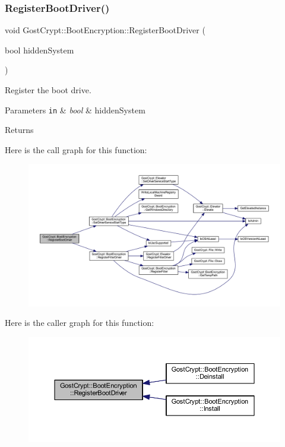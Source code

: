 \subsubsection{\texorpdfstring{Register\+Boot\+Driver()}{RegisterBootDriver()}}
{\footnotesize\ttfamily void Gost\+Crypt\+::\+Boot\+Encryption\+::\+Register\+Boot\+Driver (\begin{DoxyParamCaption}\item[{bool}]{hidden\+System }\end{DoxyParamCaption})}



Register the boot drive. 


\begin{DoxyParams}[1]{Parameters}
\mbox{\tt in}  & {\em bool} & hidden\+System \\
\hline
\end{DoxyParams}
\begin{DoxyReturn}{Returns}

\end{DoxyReturn}
Here is the call graph for this function\+:
\nopagebreak
\begin{figure}[H]
\begin{center}
\leavevmode
\includegraphics[width=350pt]{class_gost_crypt_1_1_boot_encryption_ab800499c17495d75aecfd93cd0942690_cgraph}
\end{center}
\end{figure}
Here is the caller graph for this function\+:
\nopagebreak
\begin{figure}[H]
\begin{center}
\leavevmode
\includegraphics[width=350pt]{class_gost_crypt_1_1_boot_encryption_ab800499c17495d75aecfd93cd0942690_icgraph}
\end{center}
\end{figure}
